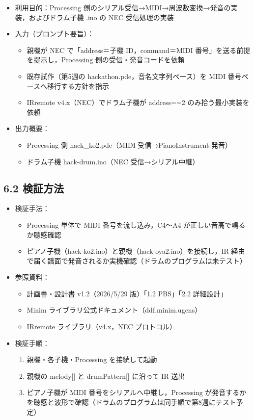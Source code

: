 \documentclass[a4paper,11pt]{ltjsarticle}
\providecommand{\％}{\%}
\begin{document}
\begin{itemize}
    \item 利用目的：Processing 側のシリアル受信→MIDI→周波数変換→発音の実装，およびドラム子機 .ino の NEC 受信処理の実装
    \item 入力（プロンプト要旨）：
    \begin{itemize}
        \item 親機が NEC で「address＝子機 ID，command＝MIDI 番号」を送る前提を提示し，Processing 側の受信・発音コードを依頼
        \item 既存試作（第5週の hackathon.pde，音名文字列ベース）を MIDI 番号ベースへ移行する方針を指示
        \item IRremote v4.x（NEC）でドラム子機が address==2 のみ拾う最小実装を依頼
    \end{itemize}
    \item 出力概要：
    \begin{itemize}
        \item Processing 側 hack\_ko2.pde（MIDI 受信→PianoInstrument 発音）
        \item ドラム子機 hack-drum.ino（NEC 受信→シリアル中継）
    \end{itemize}
\end{itemize}

\subsection*{6.2 検証方法}

\begin{itemize}
    \item 検証手法：
    \begin{itemize}
        \item Processing 単体で MIDI 番号を流し込み，C4〜A4 が正しい音高で鳴るか聴感確認
        \item ピアノ子機（hack-ko2.ino）と親機（hack-oya2.ino）を接続し，IR 経由で届く譜面で発音されるか実機確認（ドラムのプログラムは未テスト）
    \end{itemize}
    \item 参照資料：
    \begin{itemize}
        \item 計画書・設計書 v1.2（2026/5/29 版）「1.2 PBS」「2.2 詳細設計」
        \item Minim ライブラリ公式ドキュメント（ddf.minim.ugens）
        \item IRremote ライブラリ（v4.x，NEC プロトコル）
    \end{itemize}
    \item 検証手順：
    \begin{enumerate}
        \item 親機・各子機・Processing を接続して起動
        \item 親機の melody[] と drumPattern[] に沿って IR 送出
        \item ピアノ子機が MIDI 番号をシリアルへ中継し，Processing が発音するかを聴感と波形で確認（ドラムのプログラムは同手順で第8週にテスト予定）
    \end{enumerate}
\end{itemize}
\end{document}
